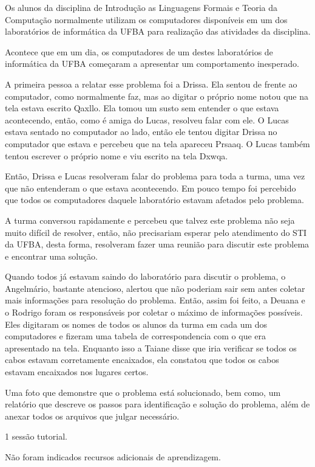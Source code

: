 Os alunos da disciplina de Introdução as Linguagens Formais e Teoria da Computação normalmente
utilizam os computadores disponíveis em um dos laboratórios de informática da UFBA para
realização das atividades da disciplina.

Acontece que em um dia, os computadores de um destes laboratórios
de informática da UFBA começaram a apresentar um comportamento inesperado.

A primeira pessoa a relatar esse problema foi a Drissa.
Ela sentou de frente ao computador, como normalmente faz, mas ao digitar o próprio nome notou
que na tela estava escrito Qaxllo.
Ela tomou um susto sem entender o que estava acontecendo, então, como é amiga do Lucas, resolveu falar
com ele.
O Lucas estava sentado no computador ao lado, então ele tentou digitar Drissa no computador
que estava e percebeu que na tela apareceu Prsaaq.
O Lucas também tentou escrever o próprio nome e viu escrito na tela Dxwqa.

Então, Drissa e Lucas resolveram falar do problema para toda a turma, uma vez que não entenderam o
que estava acontecendo.
Em pouco tempo foi percebido que todos os computadores daquele laboratório estavam afetados
pelo problema.

A turma conversou rapidamente e percebeu que talvez este problema não seja muito difícil de resolver, então,
não precisariam esperar pelo atendimento do STI da UFBA, desta forma, resolveram fazer uma reunião para
discutir este problema e encontrar uma solução.

Quando todos já estavam saindo do laboratório para discutir o problema, o Angelmário, bastante atencioso,
alertou que não poderiam sair sem antes coletar mais informações para resolução do problema.
Então, assim foi feito, a Deuana e o Rodrigo foram os responsáveis por coletar o máximo de informações
possíveis.
Eles digitaram os nomes de todos os alunos da turma em cada um dos computadores e fizeram uma tabela de
correspondencia com o que era apresentado na tela.
Enquanto isso a Taiane disse que iria verificar se todos os cabos estavam
corretamente encaixados, ela constatou que todos os cabos estavam encaixados nos lugares certos.

Uma foto que demonstre que o problema está solucionado, bem como, um relatório que descreve os passos
para identificação e solução do problema, além de anexar todos os arquivos que julgar necessário.


1 sessão tutorial.

Não foram indicados recursos adicionais de aprendizagem.
